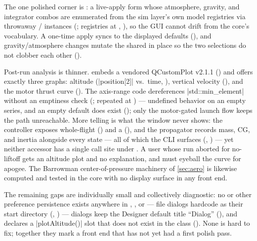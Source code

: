 The one polished corner is : a live-apply form whose atmosphere, gravity, and
integrator combos are enumerated from the sim layer's own model registries via throwaway
/ instances (; registries at
, ), so the GUI cannot drift from the core's
vocabulary. A one-time apply syncs  to the displayed defaults
(), and gravity/atmosphere changes mutate the shared
 in place so the two selections do not clobber each other
(). \fpresent

Post-run analysis is thinner.  embeds a vendored QCustomPlot v2.1.1
() and offers exactly three graphs: altitude
(\cppinline|position[2]| vs.\ time, ), vertical velocity
(), and the motor thrust curve ().
The axis-range code dereferences \cppinline|std::min_element| without an emptiness check
(; repeated at ) ---
undefined behavior on an empty series, and an empty default  does exist
(); only the motor-gated launch flow keeps the path unreachable. More
telling is what the window never shows: the controller exposes whole-flight
 () and a 
(), and the propagator records mass, CG, and inertia alongside every state ---
all of which the CLI surfaces (, ) --- yet neither
accessor has a single call site under . A user whose run aborted for no-liftoff gets an
altitude plot and no explanation, and must eyeball the curve for apogee. The Barrowman
center-of-pressure machinery of \cref{sec:aero} is likewise computed and tested in the core with no
display surface in any front end. \fpartial

The remaining gaps are individually small and collectively diagnostic: no  or other
preference persistence exists anywhere in , , or  ---
file dialogs hardcode  as their start directory (,
) --- dialogs keep the Designer default title ``Dialog''
(), and  declares a
\cppinline|plotAltitude()| slot that does not exist in the class ().
None is hard to fix; together they mark a front end that has not yet had a first polish pass.

